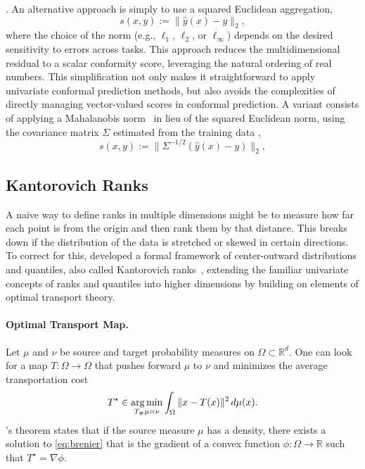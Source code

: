 \MergeCP. An alternative approach is simply to use a squared Euclidean aggregation, 
$$
s(x, y) :=  \|\hat{y}(x) - y\|_2,
$$
where the choice of the norm (e.g., $\ell_1$, $\ell_2$, or $\ell_\infty$) depends on the desired sensitivity to errors across tasks. This approach reduces the multidimensional residual to a scalar conformity score, leveraging the natural ordering of real numbers. This simplification not only makes it straightforward to apply univariate conformal prediction methods, but also avoids the complexities of directly managing vector-valued scores in conformal prediction. A variant consists of applying a Mahalanobis norm~\citep{pmlr-v152-johnstone21a} in lieu of the squared Euclidean norm, using the covariance matrix $\Sigma$ estimated from the training data \citep{pmlr-v152-johnstone21a,pmlr-v230-katsios24a, henderson2024adaptive}, 
$$
s(x, y) :=  \|\Sigma^{-1/2}(\hat{y}(x) - y)\|_2,
$$




\subsection{Kantorovich Ranks}
A naive way to define ranks in multiple dimensions might be to measure how far each point is from the origin and then rank them by that distance. This breaks down if the distribution of the data is stretched or skewed in certain directions. To correct for this, \citet{hallin2021} developed a formal framework of center-outward distributions and quantiles, also called Kantorovich ranks~\citep{chernozhukov2017}, extending the familiar univariate concepts of ranks and quantiles into higher dimensions by building on elements of optimal transport theory.

\paragraph{Optimal Transport Map.} Let $\mu$  and $\nu$ be source and target probability measures on $\Omega \subset \mathbb{R}^d$. One can look for a map $T: \Omega \to \Omega$ that pushes forward $\mu$ to $\nu$ and minimizes the average transportation cost
\begin{equation}\label{eq:brenier}
T^\star \in \mathop{\mathrm{arg\,min}}_{T_\# \mu = \nu} \int_{\Omega} \|x - T(x)\|^2 \, d\mu(x).
\end{equation}
\citeauthor{Bre91}’s theorem states that if the source measure $\mu$ has a density, there exists a solution to \eqref{eq:brenier} that is the gradient of a convex function $\phi: \Omega \to \mathbb{R}$ such that $T^\star = \nabla \phi$.


